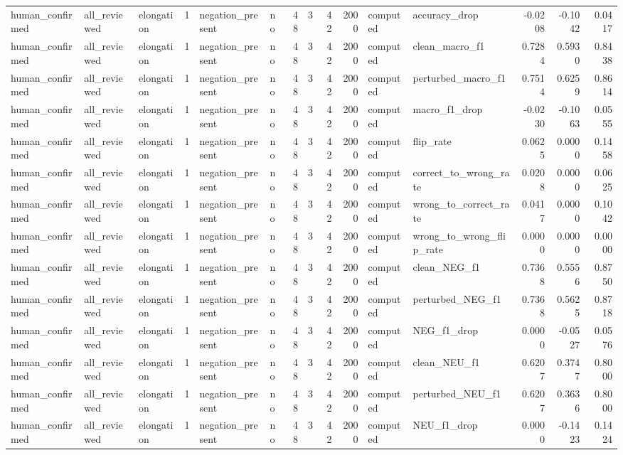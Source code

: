 \begin{tabular}{lllrllrrrrllrrr}
human_confirmed & all_reviewed & elongation & 1 & negation_present & no & 48 & 3 & 42 & 2000 & computed & accuracy_drop & -0.0208 & -0.1042 & 0.0417 \\
human_confirmed & all_reviewed & elongation & 1 & negation_present & no & 48 & 3 & 42 & 2000 & computed & clean_macro_f1 & 0.7284 & 0.5930 & 0.8438 \\
human_confirmed & all_reviewed & elongation & 1 & negation_present & no & 48 & 3 & 42 & 2000 & computed & perturbed_macro_f1 & 0.7514 & 0.6259 & 0.8614 \\
human_confirmed & all_reviewed & elongation & 1 & negation_present & no & 48 & 3 & 42 & 2000 & computed & macro_f1_drop & -0.0230 & -0.1063 & 0.0555 \\
human_confirmed & all_reviewed & elongation & 1 & negation_present & no & 48 & 3 & 42 & 2000 & computed & flip_rate & 0.0625 & 0.0000 & 0.1458 \\
human_confirmed & all_reviewed & elongation & 1 & negation_present & no & 48 & 3 & 42 & 2000 & computed & correct_to_wrong_rate & 0.0208 & 0.0000 & 0.0625 \\
human_confirmed & all_reviewed & elongation & 1 & negation_present & no & 48 & 3 & 42 & 2000 & computed & wrong_to_correct_rate & 0.0417 & 0.0000 & 0.1042 \\
human_confirmed & all_reviewed & elongation & 1 & negation_present & no & 48 & 3 & 42 & 2000 & computed & wrong_to_wrong_flip_rate & 0.0000 & 0.0000 & 0.0000 \\
human_confirmed & all_reviewed & elongation & 1 & negation_present & no & 48 & 3 & 42 & 2000 & computed & clean_NEG_f1 & 0.7368 & 0.5556 & 0.8750 \\
human_confirmed & all_reviewed & elongation & 1 & negation_present & no & 48 & 3 & 42 & 2000 & computed & perturbed_NEG_f1 & 0.7368 & 0.5625 & 0.8718 \\
human_confirmed & all_reviewed & elongation & 1 & negation_present & no & 48 & 3 & 42 & 2000 & computed & NEG_f1_drop & 0.0000 & -0.0527 & 0.0576 \\
human_confirmed & all_reviewed & elongation & 1 & negation_present & no & 48 & 3 & 42 & 2000 & computed & clean_NEU_f1 & 0.6207 & 0.3747 & 0.8000 \\
human_confirmed & all_reviewed & elongation & 1 & negation_present & no & 48 & 3 & 42 & 2000 & computed & perturbed_NEU_f1 & 0.6207 & 0.3636 & 0.8000 \\
human_confirmed & all_reviewed & elongation & 1 & negation_present & no & 48 & 3 & 42 & 2000 & computed & NEU_f1_drop & 0.0000 & -0.1423 & 0.1424 \\

\end{tabular}
